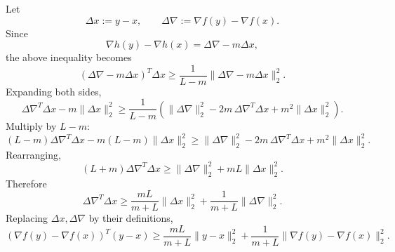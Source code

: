 \documentclass[11pt,letter,notitlepage]{article}
\theoremstyle{definition}
\begin{document}
\begin{solution}
\begin{enumerate}[label=(\alph*)]
    Let
    \[
    \Delta x := y-x,\qquad \Delta \nabla := \nabla f(y)-\nabla f(x).
    \]
    Since
    \[
    \nabla h(y)-\nabla h(x)=\Delta \nabla - m\Delta x,
    \]
    the above inequality becomes
    \[
    (\Delta \nabla-m\Delta x)^T\Delta x
    \ge
    \frac{1}{L-m}\|\Delta \nabla-m\Delta x\|_2^2.
    \]
    Expanding both sides,
    \[
    \Delta \nabla^T\Delta x-m\|\Delta x\|_2^2
    \ge
    \frac{1}{L-m}
    \left(
    \|\Delta \nabla\|_2^2-2m\,\Delta \nabla^T\Delta x+m^2\|\Delta x\|_2^2
    \right).
    \]
    Multiply by $L-m$:
    \[
    (L-m)\Delta \nabla^T\Delta x-m(L-m)\|\Delta x\|_2^2
    \ge
    \|\Delta \nabla\|_2^2-2m\,\Delta \nabla^T\Delta x+m^2\|\Delta x\|_2^2.
    \]
    Rearranging,
    \[
    (L+m)\Delta \nabla^T\Delta x
    \ge
    \|\Delta \nabla\|_2^2+mL\|\Delta x\|_2^2.
    \]
    Therefore
    \[
    \Delta \nabla^T\Delta x
    \ge
    \frac{mL}{m+L}\|\Delta x\|_2^2
    +
    \frac{1}{m+L}\|\Delta \nabla\|_2^2.
    \]
    Replacing $\Delta x,\Delta \nabla$ by their definitions,
    \[
    (\nabla f(y)-\nabla f(x))^T(y-x)
    \ge
    \frac{mL}{m+L}\|y-x\|_2^2
    +
    \frac{1}{m+L}\|\nabla f(y)-\nabla f(x)\|_2^2.
    \]
\end{enumerate}
\end{solution}

\newpage
\end{document}
